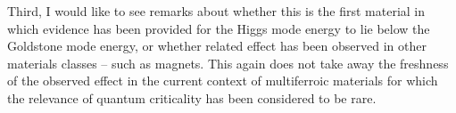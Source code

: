 Third, I would like to see remarks about whether this is the first material in which evidence has been provided for the Higgs mode energy to lie below the Goldstone mode energy, or whether related effect has been observed in other materials classes -- such as magnets. This again does not take away the freshness of the observed effect in the current context of multiferroic materials for which the relevance of quantum criticality has been considered to be rare.
